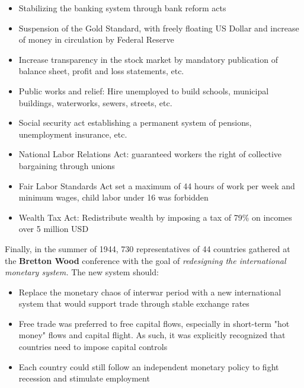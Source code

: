 \documentclass[a4paper]{extarticle}
\begin{document}
\begin{itemize}
    \item Stabilizing the banking system through bank reform acts
    \item Suspension of the Gold Standard, with freely floating US Dollar and increase of money in circulation by Federal Reserve
    \item Increase transparency in the stock market by mandatory publication of balance sheet, profit and loss statements, etc.
    \item Public works and relief: Hire unemployed to build schools, municipal buildings, waterworks, sewers, streets, etc.
    \item Social security act establishing a permanent system of pensions, unemployment insurance, etc.
    \item National Labor Relations Act: guaranteed workers the right of collective bargaining through unions
    \item Fair Labor Standards Act set a maximum of 44 hours of work per week and minimum wages, child labor under 16 was forbidden
    \item Wealth Tax Act: Redistribute wealth by imposing a tax of 79\% on incomes over 5 million USD
\end{itemize}

Finally, in the summer of 1944, 730 representatives of 44 countries gathered at the \textbf{Bretton Wood} conference with the goal of \textit{redesigning the international monetary system.} The new system should:

\begin{itemize}
    \item Replace the monetary chaos of interwar period with a new international system that would support trade through stable exchange rates
    \item Free trade was preferred to free capital flows, especially in short-term "hot money" flows and capital flight. As such, it was explicitly recognized that countries need to impose capital controls
    \item Each country could still follow an independent monetary policy to fight recession and stimulate employment
\end{itemize}
\end{document}
